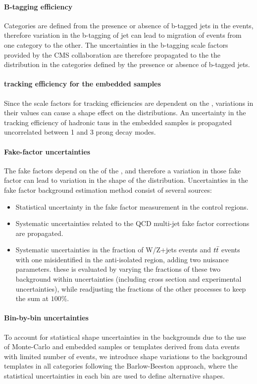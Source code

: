 \paragraph{B-tagging efficiency} Categories are defined from the presence or absence of b-tagged jets in the events, therefore variation in the b-tagging of jet can lead to migration of events from one category to the other. The uncertainties in the b-tagging scale factors provided by the CMS collaboration are therefore propagated to the the \mttot distribution in the categories defined by the presence or absence of b-tagged jets.

\paragraph{\tauh tracking efficiency for the embedded samples} Since the scale factors for tracking efficiencies are dependent on the \tauh \pt, variations in their values can cause a shape effect on the \mttot distributions. An uncertainty in the tracking efficiency of hadronic taus in the embedded samples is propagated uncorrelated between 1 and 3 prong decay modes.

\paragraph{Fake-factor uncertainties} The fake factors depend on the \pt of the \tauh, and therefore a variation in those fake factor can lead to variation in the shape of the \mttot distribution. Uncertainties in the fake factor background estimation method consist of several sources:
\begin{itemize}
    \item Statistical uncertainty in the fake factor measurement in the control regions.
    \item Systematic uncertainties related to the QCD multi-jet fake factor corrections are propagated.
    \item Systematic uncertainties in the fraction of W/Z+jets events and $t\Bar{t}$ events with one misidentified \tauh in the anti-isolated region, adding two nuisance parameters. these is evaluated by varying the fractions of these two background within uncertainties (including cross section and experimental uncertainties), while readjusting the fractions of the other processes to keep the sum at $100\%$.
\end{itemize}

\paragraph{Bin-by-bin uncertainties} To account for statistical shape uncertainties in the backgrounds due to the use of Monte-Carlo and embedded samples or templates derived from data events with limited number of events, we introduce shape variations to the background templates in all categories following the Barlow-Beeston approach, where the statistical uncertainties in each bin are used to define alternative shapes.

